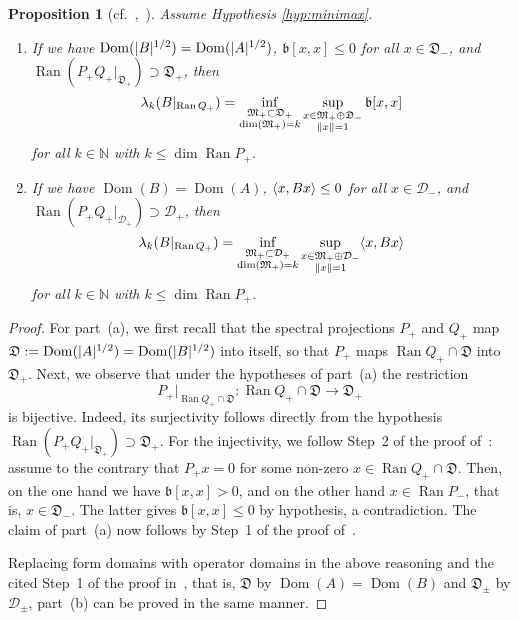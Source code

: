 \documentclass[11pt,a4paper]{amsart}
\numberwithin{equation}{section}
\DeclareMathOperator{\Ran}{Ran}
\DeclareMathOperator{\Dom}{Dom}
\DeclarePairedDelimiter{\abs}{|}{|}
\DeclarePairedDelimiter{\norm}{\lVert}{\rVert}
\DeclarePairedDelimiter{\scprod}{\langle}{\rangle}
\newcommand{\NN}{\mathbb{N}}
\newcommand{\cD}{{\mathcal D}}
\newcommand{\fb}{{\mathfrak b}}
\newcommand{\fD}{{\mathfrak D}}
\newcommand{\fM}{{\mathfrak M}}
\theoremstyle{plain}
\newtheorem{proposition}[theorem]{Proposition}
\theoremstyle{definition}
\theoremstyle{remark}
\begin{document}
\begin{proposition}[{cf.~\cite[Theorem 1]{GLS99},~\cite[Proposition~A.3]{NSTTV18}}]\label{prop:GLS}
  Assume Hypothesis \ref{hyp:minimax}.
  \begin{enumerate}
    \renewcommand{\theenumi}{\alph{enumi}}

    \item
    If we have $\Dom(\abs{B}^{1/2}) = \Dom(\abs{A}^{1/2})$, $\fb[x,x]\le0$ for all $x\in\fD_-$, and
    $\Ran(P_+Q_+|_{\fD_+}) \supset \fD_+$, then
    \begin{equation*}
      \lambda_k(B|_{\Ran Q_+})
      =
      \inf_{\substack{\fM_+\subset\fD_+\\ \dim(\fM_+)=k}} \sup_{\substack{x\in\fM_+\oplus\fD_-\\ \norm{x}=1}} \fb[x,x]
    \end{equation*}
    for all $k \in \NN$ with $k \le \dim\Ran P_+$.

    \item
    If we have $\Dom(B) = \Dom(A)$, $\scprod{ x , Bx } \le 0$ for all $x \in \cD_-$, and $\Ran(P_+Q_+|_{\cD_+}) \supset \cD_+$,
    then
    \begin{equation*}
      \lambda_k(B|_{\Ran Q_+})
      =
      \inf_{\substack{\fM_+\subset\cD_+\\ \dim(\fM_+)=k}} \sup_{\substack{x\in\fM_+\oplus\cD_-\\ \norm{x}=1}}
        \scprod{ x , Bx }
    \end{equation*}
    for all $k \in \NN$ with $k \le \dim\Ran P_+$.

  \end{enumerate}
\end{proposition}

\begin{proof}
  For part~(a), we first recall that the spectral projections $P_+$ and $Q_+$ map
  $\fD := \Dom(\abs{A}^{1/2}) = \Dom(\abs{B}^{1/2})$ into itself, so that $P_+$ maps $\Ran Q_+ \cap \fD$ into $\fD_+$. Next, we
  observe that under the hypotheses of part~(a) the restriction
  \begin{equation}\label{eq:restriction}
    P_+|_{\Ran Q_+\cap\fD} \colon \Ran Q_+\cap\fD\to\fD_+
  \end{equation}
  is bijective. Indeed, its surjectivity follows directly from the hypothesis $\Ran(P_+Q_+|_{\fD_+}) \supset \fD_+$. For the
  injectivity, we follow Step~2 of the proof of~\cite[Theorem~1]{GLS99}: assume to the contrary that $P_+x = 0$ for some non-zero
  $x \in \Ran Q_+ \cap \fD$. Then, on the one hand we have $\fb[x , x] > 0$, and on the other hand $x \in \Ran P_-$, that is,
  $x \in \fD_-$. The latter gives $\fb[x , x] \le 0$ by hypothesis, a contradiction. The claim of part~(a) now follows by Step~1
  of the proof of~\cite[Theorem~1]{GLS99}.

  Replacing form domains with operator domains in the above reasoning and the cited Step~1 of the proof in~\cite{GLS99}, that is,
  $\fD$ by $\Dom(A)=\Dom(B)$ and $\fD_\pm$ by $\cD_\pm$, part~(b) can be proved in the same manner.
\end{proof}%
\end{document}
